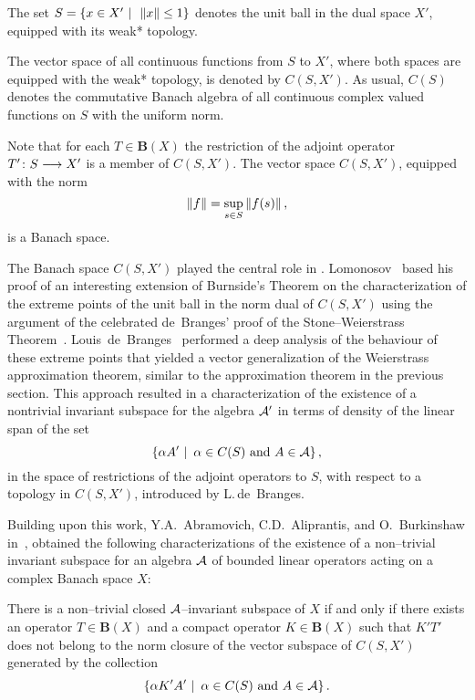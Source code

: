 \medskip
\goodbreak

The set $S=\left\{x\in X'\,\,|\,\,\,\left\Vert x\right\Vert\leq1\right\}$ denotes the
unit ball in the dual space $X'$, equipped with its weak*
topology.

\begin{defn}
The vector space of all continuous functions from $S$ to $X'$,
where both spaces are equipped with the weak* topology, is
denoted by $C(S,X')$. As usual, $C(S)$ denotes the commutative
Banach algebra of all continuous complex valued functions on
$S$ with the uniform norm.
\end{defn}

Note that for each $T\in \mathbf{B}(X)$ the restriction of the
adjoint operator $T'\colon S\longrightarrow X'$ is a member of $C(S,X')$.
The vector space $C(S,X')$, equipped with the norm
\[ \left\Vert f\right\Vert = \sup_{s\in S} \left\Vert f(s)\right\Vert, \]
is a Banach space.

\smallskip

The Banach space $C(S,X')$ played the central role in
\cite{AAB95,dB93,Lom91}. Lomonosov~\cite{Lom91} based his proof
of an interesting extension of Burnside's Theorem on the
characterization of the extreme points of the unit ball in the
norm dual of $C(S,X')$ using the argument of the celebrated
de~Branges' proof of the Stone--Weierstrass
Theorem~\cite{dB59}. Louis~de~Branges~\cite{dB93} performed a
deep analysis of the behaviour of these extreme points that
yielded a vector generalization of the Weierstrass
approximation theorem, similar to the approximation theorem in
the previous section. This approach resulted in a
characterization of the existence of a nontrivial invariant
subspace for the algebra ${\cal A}'$ in terms of density of the
linear span of the set
\[ \left\{ \alpha A'\,\,|\,\,\, \alpha \in C(S) \text{ and } A \in {\cal A}\right\}, \]
in the space of restrictions of the adjoint operators to $S$,
with respect to a topology in $C(S,X')$, introduced by
L.\,de~Branges.

\smallskip

Building upon this work, Y.A.~Abramovich, C.D.~Aliprantis, and
O.~Burkinshaw in~\cite{AAB95}, obtained the following
characterizations of the existence of a non--trivial invariant
subspace for an algebra ${\cal A}$ of bounded linear operators acting
on a complex Banach space $X$:

\smallskip

\begin{thm}
\label{t:AAB1} There is a non--trivial closed ${\cal A}$--invariant
subspace of $X$ if and only if there exists an operator $T\in
\mathbf{B}(X)$ and a compact operator $K\in \mathbf{B}(X)$ such
that $K'T'$ does not belong to the norm closure of the vector
subspace of $C(S,X')$ generated by the collection
\[ \left\{\alpha K'A'\,\,|\,\,\, \alpha \in C(S) \text{ and } A \in {\cal A}\right\}. \]
\end{thm}

